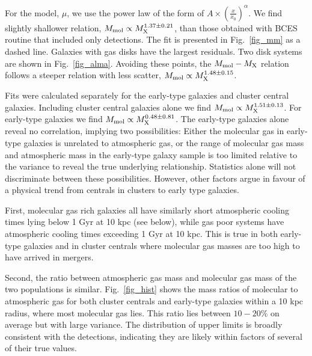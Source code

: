 \documentclass[iop]{emulateapj}
\begin{document}
For the model, $\mu$, we use the power law of the form of $A\times\left(\frac{x}{x_0} \right)^{\alpha}$. We find slightly shallower relation, $M_{\rm mol} \propto M_{\rm X}^{1.37\pm0.21}$, than those obtained with BCES routine that included only detections. The fit is presented in Fig.~\ref{fig_mm} as a dashed line. Galaxies with gas disks have the largest residuals. Two disk systems are shown in Fig.~\ref{fig_alma}. Avoiding these points, the $M_{\rm mol}-M_{\rm X}$ relation follows a steeper relation with less scatter, $M_{\rm mol} \propto M_{\rm X}^{1.48\pm0.15}$. 

Fits were calculated separately for the early-type galaxies and cluster central galaxies. Including cluster central galaxies alone we find  $M_{\rm mol} \propto M_{\rm X}^{1.51\pm0.13}$.  For early-type galaxies we find $M_{\rm mol} \propto M_{\rm X}^{0.48\pm0.81}$.  The early-type galaxies alone reveal no correlation, implying two possibilities:  Either the molecular gas in early-type galaxies is unrelated to atmospheric gas, or the range of molecular gas mass and atmospheric mass in the early-type galaxy sample is too limited relative to the variance to reveal the true underlying relationship.  Statistics alone will not discriminate between these possibilities.  
However, other factors argue in favour of a physical trend from centrals in clusters to early type galaxies.  

First, molecular gas rich galaxies all have similarly short atmospheric cooling times lying below 1 Gyr at 10 kpc (see below), while gas poor systems have atmospheric cooling times exceeding 1 Gyr at 10 kpc. This is true in both early-type galaxies and in cluster centrals where molecular gas masses are too high to have arrived in mergers. 

Second, the ratio between atmospheric gas mass and molecular gas mass of the two populations is similar.   Fig.~\ref{fig_hist} shows the mass ratios of molecular to atmospheric gas for both cluster centrals and early-type galaxies within a 10 kpc radius, where most molecular gas lies.   This ratio lies between $10-20\%$ on average but with large variance. The distribution of upper limits is broadly consistent with the detections, indicating they are likely within factors of several of their true values.  

\end{document}
